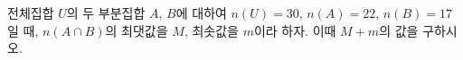 전체집합 $U$의 두 부분집합 $A$, $B$에 대하여 $n(U)=30$, $n(A)=22$, $n(B)=17$일 때, $n(A\cap B)$의 최댓값을 $M$, 최솟값을 $m$이라 하자. 이때 $M+m$의 값을 구하시오.
